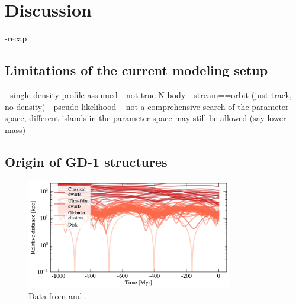 \documentclass[12pt, modern]{aastex62}
\newcommand{\acronym}[1]{{\small{#1}}}
\newcommand{\lcdm}{\acronym{$\Lambda$CDM}}
\begin{document}
\section{Discussion}
\label{sec:discussion}
-recap

\subsection{Limitations of the current modeling setup}
- single density profile assumed
- not true N-body
- stream==orbit (just track, no density)
- pseudo-likelihood -- not a comprehensive search of the parameter space, different islands in the parameter space may still be allowed (say lower mass)

\subsection{Origin of GD-1 structures}

\begin{figure}
\begin{center}
\includegraphics[width=0.8\textwidth]{satellite_distances.pdf}
\end{center}
\caption{Data from \citet{simon2018} and \citet{gdr2_satellites}.}
\label{fig:known_encounters}
\end{figure}
\end{document}
